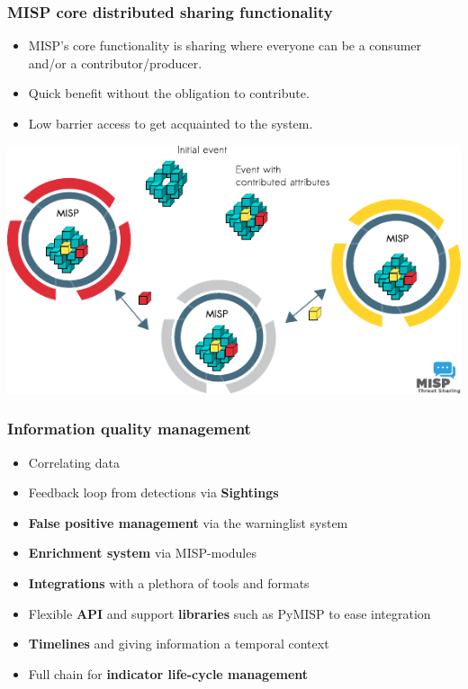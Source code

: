 \begin{frame}
\frametitle{MISP core distributed sharing functionality}
    \begin{itemize}
        \item MISP's core functionality is sharing where everyone can be a consumer and/or a contributor/producer.
        \item Quick benefit without the obligation to contribute.
        \item Low barrier access to get acquainted to the system.
    \end{itemize}
    \includegraphics[scale=0.9]{misp-distributed.pdf}
\end{frame}



\begin{frame}
\frametitle{Information quality management}
    \begin{itemize}
        \item Correlating data
        \item Feedback loop from detections via {\bf Sightings}
        \item {\bf False positive management} via the warninglist system
        \item {\bf Enrichment system} via MISP-modules
        \item {\bf Integrations} with a plethora of tools and formats
        \item Flexible {\bf API} and support {\bf libraries} such as PyMISP to ease integration
        \item {\bf Timelines} and giving information a temporal context
        \item Full chain for {\bf indicator life-cycle management}
    \end{itemize}
\end{frame}


